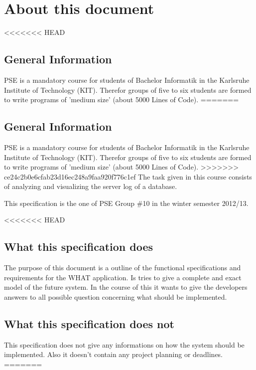 \section*{About this document}

<<<<<<< HEAD

\subsection*{General Information}
PSE is a mandatory course for students of Bachelor Informatik in the %
Karlsruhe Institute of Technology (KIT). Therefor groups of five to six
students are formed to write programs of 'medium size' (about 5000 Lines of Code).
=======
\subsection*{General Information}
PSE is a mandatory course for students of Bachelor Informatik in the %
Karlsruhe Institute of Technology (KIT). Therefor groups of five to six
students are formed to write programs of 'medium size' (about 5000 Lines of Code). 
>>>>>>> ce24c2b0e6cfab23d16ec248a9faa920f776c1ef
The task given in this course consists of analyzing and visualizing the server log of a database.

This specification is the one of PSE Group \#10 in the winter semester 2012/13.


<<<<<<< HEAD
\subsection*{What this specification does}
The purpose of this document is a outline of the functional specifications and requirements
for the WHAT application. Is tries to give a complete and exact model of the future system.
In the course of this it wants to give the developers answers to all possible question concerning
what should be implemented.


\subsection*{What this specification does not}
This specification does not give any informations on how the system should be implemented. 
Also it doesn't contain any project planning or deadlines.
=======
